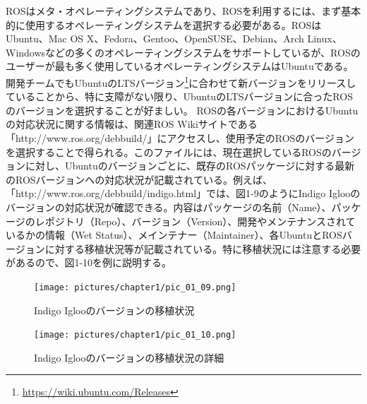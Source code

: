 ROSはメタ・オペレーティングシステムであり、ROSを利用するには、まず基本的に使用するオペレーティングシステムを選択する必要がある。ROSはUbuntu、Mac OS X、Fedora、Gentoo、OpenSUSE、Debian、Arch Linux、Windowsなどの多くのオペレーティングシステムをサポートしているが、ROSのユーザーが最も多く使用しているオペレーティングシステムはUbuntuである。開発チームでもUbuntuのLTSバージョン\footnote{\url{https://wiki.ubuntu.com/Releases}}に合わせて新バージョンをリリースしていることから、特に支障がない限り、UbuntuのLTSバージョンに合ったROSのバージョンを選択することが好ましい。
ROSの各バージョンにおけるUbuntuの対応状況に関する情報は、関連ROS Wikiサイトである「http://www.ros.org/debbuild/」にアクセスし、使用予定のROSのバージョンを選択することで得られる。このファイルには、現在選択しているROSのバージョンに対し、Ubuntuのバージョンごとに、既存のROSパッケージに対する最新のROSバージョンへの対応状況が記載されている。例えば、「http://www.ros.org/debbuild/indigo.html」では、図1-9のようにIndigo Iglooのバージョンの対応状況が確認できる。内容はパッケージの名前（Name）、パッケージのレポジトリ（Repo）、バージョン（Version）、開発やメンテナンスされているかの情報（Wet Status）、メインテナー（Maintainer）、各UbuntuとROSバージョンに対する移植状況等が記載されている。特に移植状況には注意する必要があるので、図1-10を例に説明する。

\begin{figure}[h]
  \centering
  \texttt{[image: pictures/chapter1/pic\_01\_09.png]}
  \caption{Indigo Iglooのバージョンの移植状況}
\end{figure}

\begin{figure}[h]
  \centering
  \texttt{[image: pictures/chapter1/pic\_01\_10.png]}
  \caption{Indigo Iglooのバージョンの移植状況の詳細}
\end{figure}


